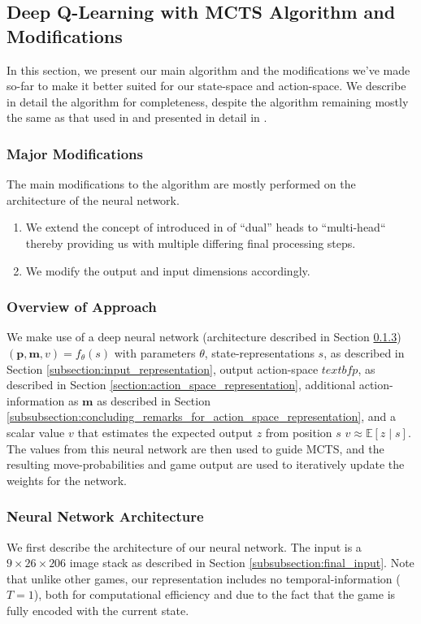 \documentclass[8pt,twocolumn]{article}
\begin{document}
\subsection{Deep Q-Learning with MCTS Algorithm and Modifications}
\label{subsection:deep_qlearning_with_mcts_algorithm_and_modifications}
In this section, we present our main algorithm and the modifications we've made so-far to make it better suited for our state-space and action-space. We describe in detail the algorithm for completeness, despite the algorithm remaining mostly the same as that used in \cite{AlphaZero} and presented in detail in \cite{AlphaGoZero}.

\subsubsection{Major Modifications}
\label{subsubsection:major_modifications}
The main modifications to the algorithm are mostly performed on the architecture of the neural network. 
\begin{enumerate}
    \item We extend the concept of introduced in \cite{AlphaGoZero} of ``dual'' heads to ``multi-head`` thereby providing us with multiple differing final processing steps. 
    \item We modify the output and input dimensions accordingly.
\end{enumerate}

\subsubsection{Overview of Approach}
\label{subsubection:overview_of_approach}
We make use of a deep neural network (architecture described in Section \ref{subsubsection:neural_network_architecture}) $(\textbf{p}, \textbf{m}, v) = f_{\theta}(s)$ with parameters $\theta$, state-representations $s$, as described in Section \ref{subsection:input_representation}, output action-space $textbf{p}$, as described in Section \ref{section:action_space_representation}, additional action-information as $\textbf{m}$ as described in Section \ref{subsubsection:concluding_remarks_for_action_space_representation}, and a scalar value $v$ that estimates the expected output $z$ from position $s$ $v \approx \mathbb{E}[z \mid s]$. The values from this neural network are then used to guide MCTS, and the resulting move-probabilities and game output are used to iteratively update the weights for the network.

\subsubsection{Neural Network Architecture}
\label{subsubsection:neural_network_architecture}
We first describe the architecture of our neural network. The input is a $9 \times 26 \times 206$ image stack as described in Section \ref{subsubsection:final_input}. Note that unlike other games, our representation includes no temporal-information ($T = 1$), both for computational efficiency and due to the fact that the game is fully encoded with the current state. 
\end{document}
